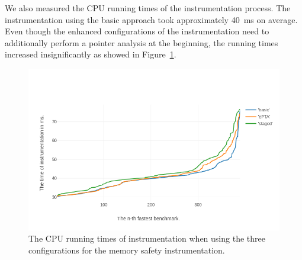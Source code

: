 We also measured the CPU running times of the instrumentation process. The
instrumentation using the basic approach took approximately 40~ms on average.
Even though the enhanced configurations of the instrumentation need to
additionally perform a pointer analysis at the beginning, the running times increased
insignificantly as showed in Figure~\ref{fig:times_chart}.

\begin{figure}[h]
  \includegraphics[width=\textwidth]{charts/instr_times_chart.png}
  \caption{The CPU running times of instrumentation when using
  the three configurations for the memory safety instrumentation.}
  \label{fig:times_chart}
\end{figure}

